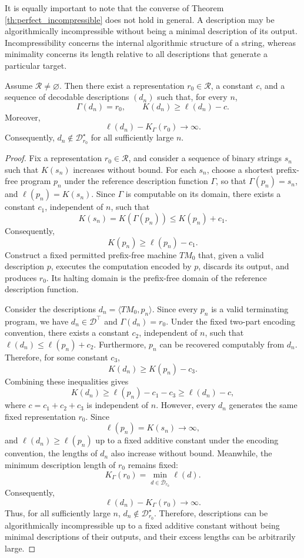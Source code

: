 It is equally important to note that the converse of Theorem \ref{th:perfect_incompressible} does not hold in general. A description may be algorithmically incompressible without being a minimal description of its output. Incompressibility concerns the internal algorithmic structure of a string, whereas minimality concerns its length relative to all descriptions that generate a particular target.

\begin{proposition}
\label{prop:incompressibility_not_minimality}
Assume $\mathcal{R}\neq\varnothing$. Then there exist a representation $r_0\in\mathcal{R}$, a constant $c$, and a sequence of decodable descriptions $(d_n)$ such that, for every $n$,
\[
\Gamma(d_n)=r_0, \qquad K(d_n)\geq\ell(d_n)-c.
\]
Moreover,
\[
\ell(d_n)-K_\Gamma(r_0)\longrightarrow\infty.
\]
Consequently, $d_n\notin\mathcal{D}_{r_0}^\star$ for all sufficiently large $n$.
\end{proposition}
\begin{proof}
Fix a representation $r_0\in\mathcal{R}$, and consider a sequence of binary strings $s_n$ such that $K(s_n)$ increases without bound. For each $s_n$, choose a shortest prefix-free program $p_n$ under the reference description function $\Gamma$, so that $\Gamma(p_n)=s_n$, and $\ell(p_n)=K(s_n)$. Since $\Gamma$ is computable on its domain, there exists a constant $c_1$, independent of $n$, such that
\[
K(s_n)=K(\Gamma(p_n))\leq K(p_n)+c_1.
\]
Consequently,
\[
K(p_n)\geq\ell(p_n)-c_1.
\]
Construct a fixed permitted prefix-free machine $TM_0$ that, given a valid description $p$, executes the computation encoded by $p$, discards its output, and produces $r_0$. Its halting domain is the prefix-free domain of the reference description function.

Consider the descriptions $d_n=\langle TM_0,p_n\rangle$. Since every $p_n$ is a valid terminating program,
we have $d_n\in\mathcal{D}^\top$ and $\Gamma(d_n)=r_0$. Under the fixed two-part encoding convention,
there exists a constant $c_2$, independent of $n$, such that $\ell(d_n)\leq\ell(p_n)+c_2$. Furthermore, $p_n$ can be recovered computably from $d_n$. Therefore, for some constant $c_3$,
\[
K(d_n)\geq K(p_n)-c_3.
\]
Combining these inequalities gives
\[
K(d_n) \geq \ell(p_n)-c_1-c_3 \geq \ell(d_n)-c,
\]
where $c=c_1+c_2+c_3$ is independent of $n$. However, every $d_n$ generates the same fixed representation $r_0$. Since
\[
\ell(p_n)=K(s_n)\longrightarrow\infty,
\]
and $\ell(d_n)\geq\ell(p_n)$ up to a fixed additive constant under the encoding convention, the lengths of $d_n$ also increase without bound. Meanwhile, the minimum description length of
$r_0$ remains fixed:
\[
K_\Gamma(r_0) = \min_{d\in\bar{\mathcal{D}}_{r_0}}\ell(d).
\]
Consequently,
\[
\ell(d_n)-K_\Gamma(r_0)\longrightarrow\infty.
\]
Thus, for all sufficiently large $n$, $d_n\notin\mathcal{D}_{r_0}^\star$. Therefore, descriptions can be algorithmically incompressible up to a fixed additive constant without being minimal descriptions of their outputs, and their excess lengths can be arbitrarily large.
\end{proof}

